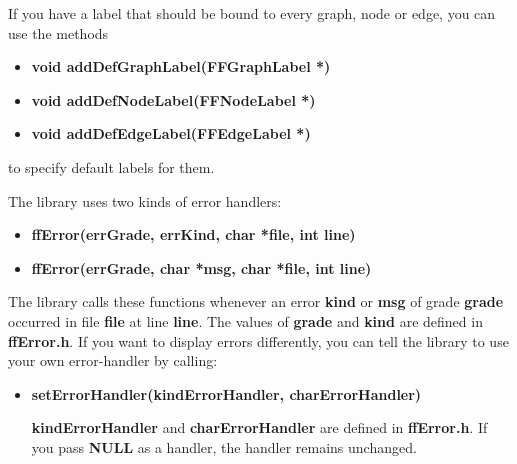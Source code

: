 If you have a label that should be bound to every graph, node or 
edge, you can use the methods

\begin{itemize}

\item{\bf void addDefGraphLabel(FFGraphLabel *)}

\item{\bf void addDefNodeLabel(FFNodeLabel *)}

\item{\bf void addDefEdgeLabel(FFEdgeLabel *)}

\end{itemize}

to specify default labels for them.\\

\bigskip

The library uses two kinds of error handlers:

\begin{itemize}

\item{\bf ffError(errGrade, errKind, char *file, int line)}

\item{\bf ffError(errGrade, char *msg, char *file, int line)}

\end{itemize}

 The library calls these functions whenever an error {\bf kind} or
{\bf msg} of grade {\bf grade} occurred in file {\bf file} at line
{\bf line}. The values of {\bf grade} and {\bf kind} are defined in
{\bf ffError.h}.  If you want to display errors differently, you can
tell the library to use your own error-handler by calling:

\begin{itemize}

\item{\bf setErrorHandler(kindErrorHandler, charErrorHandler)}

{\bf kindErrorHandler} and {\bf charErrorHandler} are defined in {\bf
ffError.h}. If you pass {\bf NULL} as a handler, the handler remains
unchanged.

\end{itemize}

